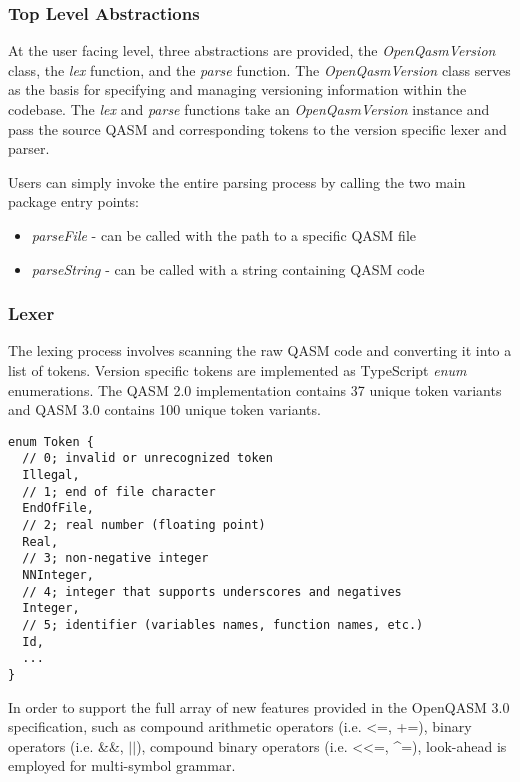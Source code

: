 \documentclass{article}
\begin{document}
\subsubsection{Top Level Abstractions}
At the user facing level, three abstractions are provided, the \textit{OpenQasmVersion} class, the \textit{lex} function, and the \textit{parse} function. The \textit{OpenQasmVersion} class serves as the basis for specifying and managing versioning information within the codebase. The \textit{lex} and \textit{parse} functions take an \textit{OpenQasmVersion} instance and pass the source QASM and corresponding tokens to the version specific lexer and parser. 

Users can simply invoke the entire parsing process by calling the two main package entry points:

\begin{itemize}
    \item \textit{parseFile} - can be called with the path to a specific QASM file 
    \item \textit{parseString} - can be called with a string containing QASM code
\end{itemize}

\subsubsection{Lexer}

The lexing process involves scanning the raw QASM code and converting it into a list of tokens. Version specific tokens are implemented as TypeScript \textit{enum} enumerations. The QASM 2.0 implementation contains 37 unique token variants and QASM 3.0 contains 100 unique token variants.  

\begin{lstlisting}
enum Token {
  // 0; invalid or unrecognized token
  Illegal,
  // 1; end of file character
  EndOfFile,
  // 2; real number (floating point)
  Real,
  // 3; non-negative integer
  NNInteger,
  // 4; integer that supports underscores and negatives
  Integer,
  // 5; identifier (variables names, function names, etc.)
  Id,
  ...
}
\end{lstlisting}

In order to support the full array of new features provided in the OpenQASM 3.0 specification, such as compound arithmetic operators (i.e. \textless =, +=), binary operators (i.e. \&\&, $||$), compound binary operators (i.e. \textless \textless=, \^{}=), look-ahead is employed for multi-symbol grammar. 
\end{document}
